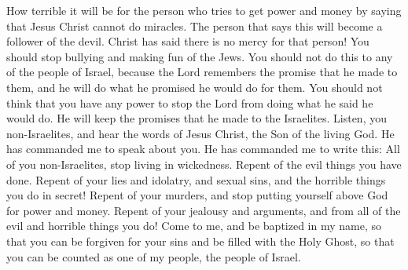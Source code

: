 How terrible it will be for the person who tries to get power and money by saying that Jesus Christ cannot do miracles. The person that says this will become a follower of the devil. Christ has said there is no mercy for that person!
\bverse \iffalse Yea, and ye need not any longer hiss, nor spurn, nor make game of the Jews, nor any of the remnant of the house of Israel; for behold, the Lord remembereth his covenant unto them, and he will do unto them according to that which he hath sworn. \fi
You should stop bullying and making fun of the Jews. You should not do this to any of the people of Israel, because the Lord remembers the promise that he made to them, and he will do what he promised he would do for them.
\bverse \iffalse Therefore ye need not suppose that ye can turn the right hand of the Lord unto the left, that he may not execute judgment unto the fulfilling of the covenant which he hath made unto the house of Israel. \fi
You should not think that you have any power to stop the Lord from doing what he said he would do. He will keep the promises that he made to the Israelites.
\bchapter
\bverse \iffalse Hearken, O ye Gentiles, and hear the words of Jesus Christ, the Son of the living God, which he hath commanded me that I should speak concerning you, for, behold he commandeth me that I should write, saying: \fi
Listen, you non-Israelites, and hear the words of Jesus Christ, the Son of the living God. He has commanded me to speak about you. He has commanded me to write this:
\bverse \iffalse Turn, all ye Gentiles, from your wicked ways; and repent of your evil doings, of your lyings and deceivings, and of your whoredoms, and of your secret abominations, and your idolatries, and of your murders, and your priestcrafts, and your envyings, and your strifes, and from all your wickedness and abominations, and come unto me, and be baptized in my name, that ye may receive a remission of your sins, and be filled with the Holy Ghost, that ye may be numbered with my people who are of the house of Israel. \fi
All of you non-Israelites, stop living in wickedness. Repent of the evil things you have done. Repent of your lies and idolatry, and sexual sins, and the horrible things you do in secret! Repent of your murders, and stop putting yourself above God for power and money. Repent of your jealousy and arguments, and from all of the evil and horrible things you do! Come to me, and be baptized in my name, so that you can be forgiven for your sins and be filled with the Holy Ghost, so that you can be counted as one of my people, the people of Israel.
